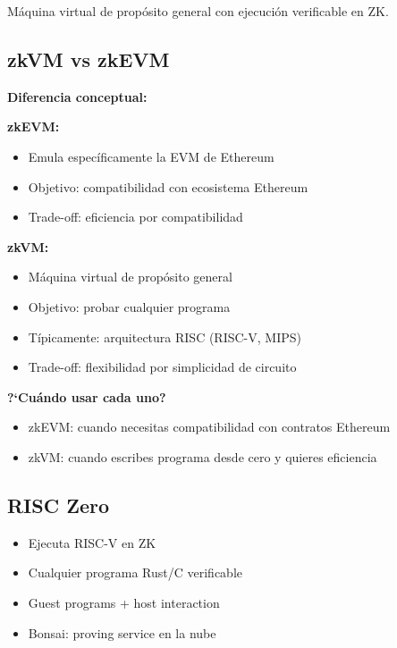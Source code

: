 \documentclass[11pt,a4paper,twoside]{book}
\begin{document}
\begin{definition}[zkVM]
M\'aquina virtual de prop\'osito general con ejecuci\'on verificable en ZK.
\end{definition}

\subsection{zkVM vs zkEVM}

\begin{keyidea}
\textbf{Diferencia conceptual:}

\textbf{zkEVM:}
\begin{itemize}
    \item Emula espec\'ificamente la EVM de Ethereum
    \item Objetivo: compatibilidad con ecosistema Ethereum
    \item Trade-off: eficiencia por compatibilidad
\end{itemize}

\textbf{zkVM:}
\begin{itemize}
    \item M\'aquina virtual de prop\'osito general
    \item Objetivo: probar cualquier programa
    \item T\'ipicamente: arquitectura RISC (RISC-V, MIPS)
    \item Trade-off: flexibilidad por simplicidad de circuito
\end{itemize}

\textbf{?`Cu\'ando usar cada uno?}
\begin{itemize}
    \item zkEVM: cuando necesitas compatibilidad con contratos Ethereum
    \item zkVM: cuando escribes programa desde cero y quieres eficiencia
\end{itemize}
\end{keyidea}

\subsection{RISC Zero}

\begin{itemize}
    \item Ejecuta RISC-V en ZK
    \item Cualquier programa Rust/C verificable
    \item Guest programs + host interaction
    \item Bonsai: proving service en la nube
\end{itemize}
\end{document}
